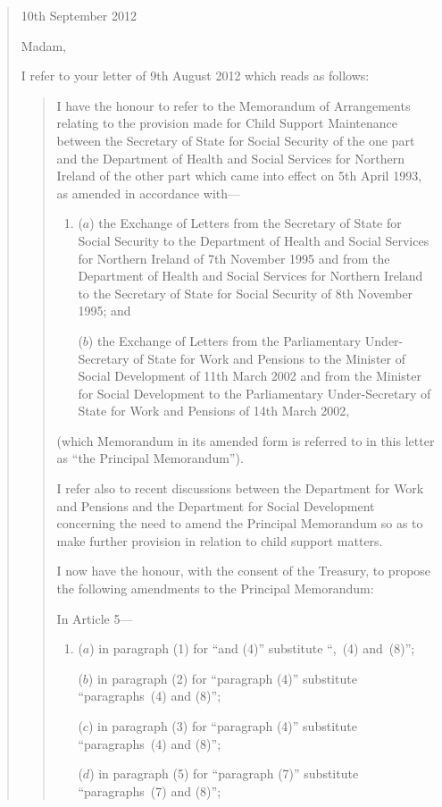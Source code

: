 \documentclass[12pt,a4paper]{article}
\begin{document}
\begin{quotation}
10th September 2012

Madam,

I refer to your letter of 9th August 2012 which reads as follows:
\begin{quotation}
I have the honour to refer to the Memorandum of Arrangements relating to the 
provision made for Child Support Maintenance between the Secretary of State for
Social Security of the one part and the Department of Health and Social Services for
Northern Ireland of the other part which came into effect on 5th April 1993, as
amended in accordance with---
\begin{enumerate}\item[]
($a$) the Exchange of Letters from the Secretary of State for Social Security to the Department of Health and Social Services for Northern Ireland of 7th November 1995 and from the Department of Health and Social Services for Northern Ireland to the Secretary of State for Social Security of 8th November 1995; and

($b$) the Exchange of Letters from the Parliamentary Under-Secretary of State for Work and Pensions to the Minister of Social Development of 11th March 2002 and from the Minister for Social Development to the Parliamentary Under-Secretary of State for Work and Pensions of 14th March 2002,
\end{enumerate}
(which Memorandum in its amended form is referred to in this letter as ``the Principal Memorandum'').

I refer also to recent discussions between the Department for Work and Pensions and the Department for Social Development concerning the need to amend the Principal Memorandum so as to make further provision in relation to child support matters.

\enlargethispage{\baselineskip}

I now have the honour, with the consent of the Treasury, to propose the following amendments to the Principal Memorandum:

In Article 5---
\begin{enumerate}\item[]
($a$) in paragraph (1) for ``and (4)'' substitute ``,~(4) and~(8)'';

($b$) in paragraph (2) for ``paragraph (4)'' substitute ``paragraphs~(4) and (8)'';

($c$) in paragraph (3) for ``paragraph (4)'' substitute ``paragraphs~(4) and (8)'';

($d$) in paragraph (5) for ``paragraph (7)'' substitute ``paragraphs~(7) and (8)'';


\end{enumerate}
\end{quotation}
\end{quotation}
\end{document}
